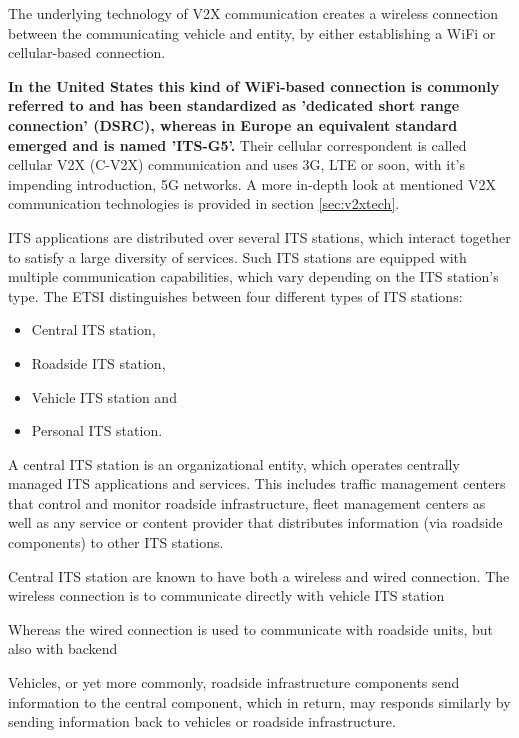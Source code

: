 The underlying technology of V2X communication creates a wireless connection between the communicating vehicle and entity, by either establishing a WiFi or cellular-based connection.

\textbf{In the United States this kind of WiFi-based connection is commonly referred to and has been standardized as 'dedicated short range connection' (DSRC), whereas in Europe an equivalent standard emerged and is named 'ITS-G5'.} Their cellular correspondent is called cellular V2X (C-V2X) communication and uses 3G, LTE or soon, with it's impending introduction, 5G networks.
A more in-depth look at mentioned V2X communication technologies is provided in section \ref{sec:v2xtech}.

ITS applications are distributed over several ITS stations, which interact together to satisfy a large diversity of services. %
Such ITS stations are equipped with multiple communication capabilities, which vary depending on the ITS station's type. The ETSI distinguishes between four different types of ITS stations: 
\begin{itemize}
    \item Central ITS station,
    \item Roadside ITS station,
    \item Vehicle ITS station and
    \item Personal ITS station.
\end{itemize}

\noindent A central ITS station is an organizational entity, which operates centrally managed ITS applications and services.
This includes traffic management centers that control and monitor roadside infrastructure, fleet management centers as well as any service or content provider that distributes information (via roadside components) to other ITS stations.

Central ITS station are known to have both a wireless and wired connection.
The wireless connection is to communicate directly with vehicle ITS station

Whereas the wired connection is 
used to communicate with roadside units, but also with backend

Vehicles, or yet more commonly, roadside infrastructure components send information to the central component, which in return, may responds similarly by sending information back to vehicles or roadside infrastructure.

